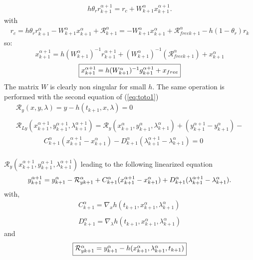 \begin{equation}
   \begin{array}{l}
 h \theta _r  r^{\alpha+1}_{k+1} = r_c + W^{\alpha}_{k+1} x^{\alpha+1}_{k+1}
 .\label{eq:NL211} 
 \end{array}
\end{equation}
with 
\begin{equation}
   \begin{array}{l}
r_c = h \theta _r r^{\alpha}_{k+1} - W^{\alpha}_{k+1} x^{\alpha}_{k+1} + \mathcal R
^{\alpha}_{k+1}=- W^{\alpha}_{k+1} x^{\alpha}_{k+1} + \mathcal R_{free k+1} ^{\alpha} - h(1-\theta_r)r_k
 \end{array}
   \end{equation}
so:
\[x^{\alpha+1}_{k+1} = h(W^{\alpha}_{k+1})^{-1}r^{\alpha+1}_{k+1} +(W^{\alpha}_{k+1})^{-1}(\mathcal R_{free k+1} ^{\alpha})+x^{\alpha}_{k+1}\]
\[\fbox{$x^{\alpha+1}_{k+1} = h(W^{\alpha}_{k+1})^{-1}g^{\alpha+1}_{k+1} +x_{free}$}\]
The matrix $W$ is clearly non singular for small $h$.
The same operation is performed with the second equation of (\ref{eq:toto1})
\begin{equation}
   \label{eq:NL29}
   \begin{array}{l}
      \mathcal R_y(x,y,\lambda)=y-h(t_{k+1},x,\lambda) =0\\ \\
      \mathcal R_{Ly}(x^{\alpha+1}_{k+1},y^{\alpha+1}_{k+1},\lambda^{\alpha+1}_{k+1}) = \mathcal
      R_{y}(x^{\alpha}_{k+1},y^{\alpha}_{k+1},\lambda^{\alpha}_{k+1}) +
      (y^{\alpha+1}_{k+1}-y^{\alpha}_{k+1})- \\ \qquad \qquad
      C^{\alpha}_{k+1}(x^{\alpha+1}_{k+1}-x^{\alpha}_{k+1}) - D^{\alpha}_{k+1}(\lambda^{\alpha+1}_{k+1}-\lambda^{\alpha}_{k+1})=0\\
      
 \end{array}
\end{equation}

$\mathcal R_y(x^{\alpha+1}_{k+1},y^{\alpha+1}_{k+1},\lambda^{\alpha+1}_{k+1})$ leading to the following linearized equation
\begin{equation}
  y^{\alpha+1}_{k+1} =  y^{\alpha}_{k+1}
  -\mathcal R^{\alpha}_{yk+1}+ \\
  C^{\alpha}_{k+1}(x^{\alpha+1}_{k+1}-x^{\alpha}_{k+1}) +
  D^{\alpha}_{k+1}(\lambda^{\alpha+1}_{k+1}-\lambda^{\alpha}_{k+1}). \label{eq:NL211y}
\end{equation}
with,
\begin{equation}
     \begin{array}{l}
  C^{\alpha}_{k+1} = \nabla_xh(t_{k+1}, x^{\alpha}_{k+1},\lambda^{\alpha}_{k+1} ) \\ \\
  D^{\alpha}_{k+1} = \nabla_{\lambda}h(t_{k+1}, x^{\alpha}_{k+1},\lambda^{\alpha}_{k+1})
 \end{array}
\end{equation}
and
\begin{equation}\fbox{$
\mathcal R^{\alpha}_{yk+1} = y^{\alpha}_{k+1} - h(x^{\alpha}_{k+1},\lambda^{\alpha}_{k+1},t_{k+1})$}
 \end{equation}

